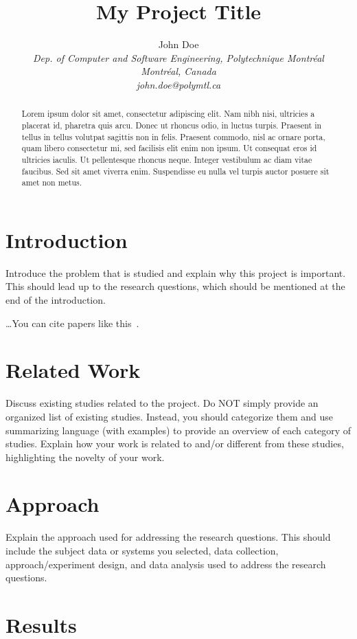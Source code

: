 \documentclass[10pt, conference]{IEEEtran}
\title{My Project Title}
\author{John Doe
    \\
    \emph{Dep. of Computer and Software Engineering, Polytechnique Montréal}
    \\
    \emph{Montréal, Canada}
    \\
    \emph{john.doe@polymtl.ca}}
\begin{document}
\maketitle

\begin{abstract}
Lorem ipsum dolor sit amet, consectetur adipiscing elit. Nam nibh nisi, ultricies a placerat id, pharetra quis arcu. Donec ut rhoncus odio, in luctus turpis. Praesent in tellus in tellus volutpat sagittis non in felis. Praesent commodo, nisl ac ornare porta, quam libero consectetur mi, sed facilisis elit enim non ipsum. Ut consequat eros id ultricies iaculis. Ut pellentesque rhoncus neque. Integer vestibulum ac diam vitae faucibus. Sed sit amet viverra enim. Suspendisse eu nulla vel turpis auctor posuere sit amet non metus.
\end{abstract}


\section{Introduction}
\label{sec:introduction}

Introduce the problem that is studied and explain why this project is important. This should lead up to the research questions, which should be mentioned at the end of the introduction.

\dots You can cite papers like this~\cite{humble10}.

\section{Related Work}
\label{sec:related-work}
Discuss existing studies related to the project. Do NOT simply provide an organized list of existing studies. Instead, you should categorize them and use summarizing language (with examples) to provide an overview of each category of studies. Explain how your work is related to and/or different from these studies, highlighting the novelty of your work.

\section{Approach}
\label{sec:approach}

Explain the approach used for addressing the research questions. This should include the subject data or systems you selected, data collection, approach/experiment design, and data analysis used to address the research questions.


\section{Results}
\label{sec:results}
\end{document}
